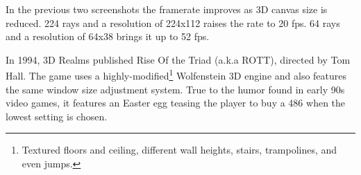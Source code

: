    \begin{figure}[H]
\centering
 \end{figure}
 \par
 In the previous two screenshots the framerate improves as 3D canvas size is reduced. 224 rays and a resolution of 224x112 raises the rate to 20 fps. 64 rays and a resolution of 64x38 brings it up to 52 fps.\\
 \par
{} In 1994, 3D Realms published Rise Of the Triad (a.k.a ROTT), directed by Tom Hall. The game uses a highly-modified\footnote{Textured floors and ceiling, different wall heights, stairs, trampolines, and even jumps.} Wolfenstein 3D engine and also features the same window size adjustment system. True to the humor found in early 90s video games, it features an Easter egg teasing the player to buy a 486 when the lowest setting is chosen.
    \begin{figure}[H]
\centering
 \end{figure}
 \par
